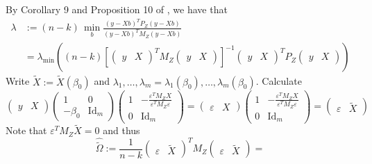 \documentclass[11pt,hidelinks,a4paper]{article}
\newcommand{\Id}{\mathrm{Id}}
\begin{document}
\begin{proofEnd}%
    By Corollary 9 and Proposition 10 of \citet{londschien2025statistician}, we have that
    \begin{align*}
    \lambda &:=  (n - k) \, \min_b \frac{ (y - X b)^T P_Z (y - X b) }{ (y - X b)^T M_Z (y - X b) } \\
    &=  \lambda_\mathrm{min} \left( (n - k) \left[ \begin{pmatrix} y & X \end{pmatrix}^T M_Z \begin{pmatrix} y & X \end{pmatrix} \right]^{-1} \begin{pmatrix} y & X \end{pmatrix}^T P_Z \begin{pmatrix} y & X \end{pmatrix} \right)
    \end{align*}
    Write $\tilde X := \tilde X (\beta_0)$ and $\lambda_1, \ldots, \lambda_m = \lambda_1(\beta_0), \ldots, \lambda_m(\beta_0)$.
    Calculate
    \begin{equation} \label{eq:clr1}
        \begin{pmatrix} y & X \end{pmatrix} \begin{pmatrix} 1 & 0 \\ - \beta_0 & \Id_m \end{pmatrix} 
        \begin{pmatrix}
             1 & -\frac{\varepsilon^T M_Z X}{\varepsilon^T M_Z \varepsilon} \\ 0 & \Id_m
         \end{pmatrix}
        =
        \begin{pmatrix} \varepsilon & X \end{pmatrix} 
        \begin{pmatrix}
            1 & -\frac{\varepsilon^T M_Z X}{\varepsilon^T M_Z \varepsilon} \\ 0 & \Id_m
        \end{pmatrix} =
        \begin{pmatrix} \varepsilon & \tilde X \end{pmatrix}
    \end{equation}
    Note that $\varepsilon^T M_Z \tilde X = 0$ and thus
    \begin{equation}\label{eq:clr2}
        \widehat{\tilde \Omega} := \frac{1}{n-k}
        \begin{pmatrix} \varepsilon & \tilde X \end{pmatrix}^T M_Z \begin{pmatrix} \varepsilon & \tilde X \end{pmatrix} = 

\end{equation}
\end{proofEnd}
\end{document}
